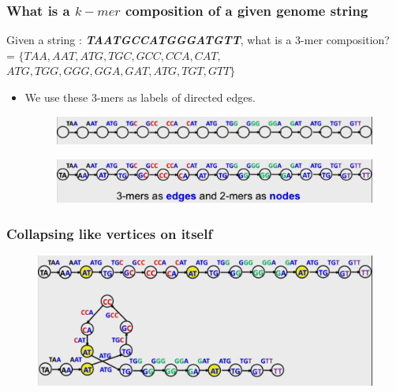 \documentclass{beamer}
\begin{document}
\begin{frame}
\frametitle{What is a $k-mer$ composition of a given genome string}

Given a string : \textbf{\textit{TAATGCCATGGGATGTT}}, what is a 3-mer composition?\\
= $\{TAA, AAT, ATG, TGC, GCC, CCA, CAT,$\\ $ ATG, TGG, GGG, GGA, GAT, ATG, TGT, GTT\}$
\begin{itemize}
\item We use these 3-mers as labels of directed edges.
\pause
\begin{figure}[h]
\includegraphics[scale = 0.4]{3mer.png}
\end{figure}
\pause
\begin{figure}[h]
\includegraphics[scale = 0.4]{3mer2mer.png}
\end{figure}
\end{itemize}
\end{frame}


\begin{frame}
\frametitle{Collapsing like vertices on itself}
\begin{figure}[h]
\includegraphics[scale = 0.4]{gluing.png}
\end{figure}
\end{frame}

\end{document}
